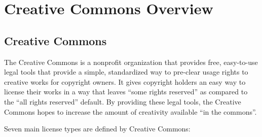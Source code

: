 \documentclass[botnum,fleqn,final]{unmeethesis}
\begin{document}
\section{\label{section:intro:cc}Creative Commons Overview}

\subsection{Creative Commons}\label{sec:model-cc}

The Creative Commons is a nonprofit organization that provides free,
easy-to-use legal tools that provide a simple, standardized way to pre-clear
usage rights to creative works for copyright owners.  It gives copyright
holders an easy way to license their works in a way that leaves ``some rights
reserved'' as compared to the ``all rights reserved'' default.  By providing
these legal tools, the Creative Commons hopes to increase the amount of
creativity available ``in the commons''.

Seven main license types are defined by Creative Commons:
\end{document}
